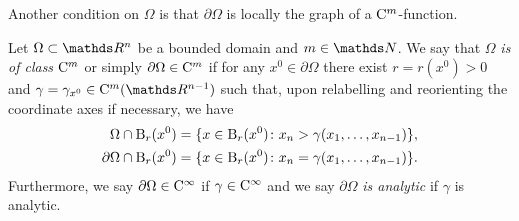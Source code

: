 Another condition on $\Omega$ is that $\partial\Omega$ is locally the graph of a $\mathrm{C}^m$-function.

\begin{defn}
  \label{defn:CmBoundary}
  Let $\Omega \subset \R^n$ be a bounded domain and $m \in \N$.
  We say that $\Omega$ \emph{is of class} $\mathrm{C}^m$ or simply $\partial\Omega \in \mathrm{C}^m$ if for any $x^0 \in \partial \Omega$ there exist $r = r(x^0) > 0$ and $\gamma = \gamma_{x^0} \in \CC^m(\R^{n - 1})$ such that, upon relabelling and reorienting the coordinate axes if necessary, we have
  \begin{align*}
     \Omega \cap \mathrm{B}_r(x^0) &= \{ x \in \mathrm{B}_r(x^0) \colon x_n > \gamma(x_1,\dots,x_{n - 1}) \}, \\
     \partial \Omega \cap \mathrm{B}_r(x^0) &= \{ x \in \mathrm{B}_r(x^0) \colon x_n = \gamma(x_1,\dots,x_{n - 1})\}.
  \end{align*}
  Furthermore, we say $\partial \Omega \in \mathrm{C}^\infty$ if $\gamma \in \mathrm{C}^\infty$ and we say $\partial \Omega$ \emph{is analytic} if $\gamma$ is analytic.
\end{defn}

